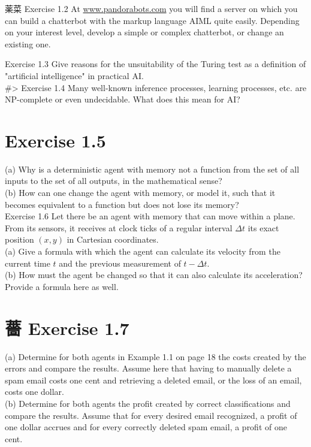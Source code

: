 \documentclass[10pt]{article}
\begin{document}
薬菜 Exercise 1.2 At \href{http://www.pandorabots.com}{www.pandorabots.com} you will find a server on which you can build a chatterbot with the markup language AIML quite easily. Depending on your interest level, develop a simple or complex chatterbot, or change an existing one.

Exercise 1.3 Give reasons for the unsuitability of the Turing test as a definition of "artificial intelligence" in practical AI.\\
\#> Exercise 1.4 Many well-known inference processes, learning processes, etc. are NP-complete or even undecidable. What does this mean for AI?

\section*{Exercise 1.5}
(a) Why is a deterministic agent with memory not a function from the set of all inputs to the set of all outputs, in the mathematical sense?\\
(b) How can one change the agent with memory, or model it, such that it becomes equivalent to a function but does not lose its memory?\\
Exercise 1.6 Let there be an agent with memory that can move within a plane. From its sensors, it receives at clock ticks of a regular interval $\Delta t$ its exact position $(x, y)$ in Cartesian coordinates.\\
(a) Give a formula with which the agent can calculate its velocity from the current time $t$ and the previous measurement of $t-\Delta t$.\\
(b) How must the agent be changed so that it can also calculate its acceleration? Provide a formula here as well.

\section*{薔 Exercise 1.7}
(a) Determine for both agents in Example 1.1 on page 18 the costs created by the errors and compare the results. Assume here that having to manually delete a spam email costs one cent and retrieving a deleted email, or the loss of an email, costs one dollar.\\
(b) Determine for both agents the profit created by correct classifications and compare the results. Assume that for every desired email recognized, a profit of one dollar accrues and for every correctly deleted spam email, a profit of one cent.
\end{document}
